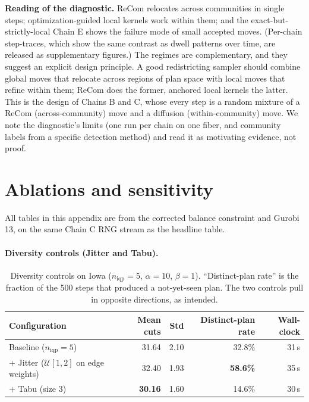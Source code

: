 \documentclass[11pt]{article}
\begin{document}
\textbf{Reading of the diagnostic.} ReCom relocates across
communities in single steps; optimization-guided local kernels work
within them; and the exact-but-strictly-local Chain E shows the
failure mode of small accepted moves. (Per-chain step-traces, which
show the same contrast as dwell patterns over time, are released as
supplementary figures.) The regimes are complementary, and they
suggest an explicit design principle. A good redistricting sampler
should combine global moves that relocate across regions of plan
space with local moves that refine within them; ReCom does the
former, anchored local kernels the latter. This is the design of
Chains B and C, whose every step is a random mixture of a ReCom
(across-community) move and a diffusion (within-community) move. We
note the diagnostic's limits (one run per chain on one fiber, and
community labels from a specific detection method) and read it as
motivating evidence, not proof.

\section{Ablations and sensitivity}\label{sec:exp-ablations}

All tables in this appendix are from the corrected balance
constraint and Gurobi 13, on the same Chain C RNG stream as the
headline table.

\paragraph{Diversity controls (Jitter and Tabu).}\label{sec:exp-diversity}

\begin{table}[htbp]
\centering
\small
\begin{tabular}{lrrrr}
\toprule
Configuration & Mean cuts & Std & Distinct-plan rate & Wall-clock \\
\midrule
Baseline ($n_{\mathrm{iqp}} = 5$)               & 31.64 & 2.10 & 32.8\% & 31\,s \\
+ Jitter ($\mathcal{U}[1,2]$ on edge weights)   & 32.40 & 1.93 & \textbf{58.6\%} & 35\,s \\
+ Tabu (size 3)                                  & \textbf{30.16} & 1.60 & 14.6\% & 30\,s \\
\bottomrule
\end{tabular}
\caption{Diversity controls on Iowa ($n_{\mathrm{iqp}} = 5$,
  $\alpha = 10$, $\beta = 1$). ``Distinct-plan rate'' is the fraction
  of the 500 steps that produced a not-yet-seen plan. The two
  controls pull in opposite directions, as intended.}\label{tab:diversity-iowa}
\end{table}
\end{document}
